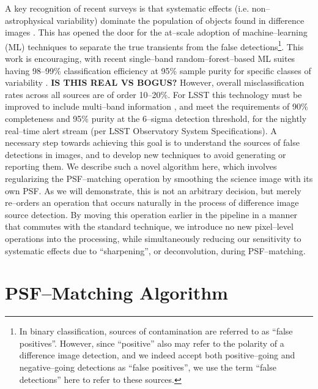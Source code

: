 \documentclass[iop]{emulateapj}
\begin{document}
A key recognition of recent surveys is that systematic effects (i.e. non--astrophysical variability) dominate the population of objects found in difference images \citep{2008AJ....135..348S,2013PASP..125..357D}.
This has opened the door for the at--scale adoption of machine--learning (ML) techniques to separate the true transients from the false detections\footnote{In binary classification, sources of contamination are referred to as ``false positives''.  However, since ``positive'' also may refer to the polarity of a difference image detection, and we indeed accept both positive--going and negative--going detections as ``false positives'', we use the term ``false detections'' here to refer to these sources.}\citep{2012PASP..124.1175B,2015arXiv150105470W}.
This work is encouraging, with recent single--band random--forest--based ML suites having 98--99\% classification efficiency at 95\% sample purity for specific classes of variability \citep{2011ApJ...733...10R}.
{\bf IS THIS REAL VS BOGUS?}
However, overall misclassification rates across all sources are of order 10--20\%.
For LSST this technology must be improved to include multi--band information \cite[e.g.][]{2015arXiv150101314K}, and meet the requirements of 90\% completeness and 95\% purity at the 6--sigma detection threshold, for the nightly real--time alert stream (per LSST Observatory System Specifications).
A necessary step towards achieving this goal is to understand the sources of false detections in images, and to develop new techniques to avoid generating or reporting them.
We describe such a novel algorithm here, which involves regularizing the PSF--matching operation by smoothing the science image with its own PSF.
As we will demonstrate, this is not an arbitrary decision, but merely re--orders an operation that occurs naturally in the process of difference image source detection.
By moving this operation earlier in the pipeline in a manner that commutes with the standard technique, we introduce no new pixel--level operations into the processing, while simultaneously reducing our sensitivity to systematic effects due to ``sharpening'', or deconvolution, during PSF--matching.


\section{PSF--Matching Algorithm}
\end{document}
